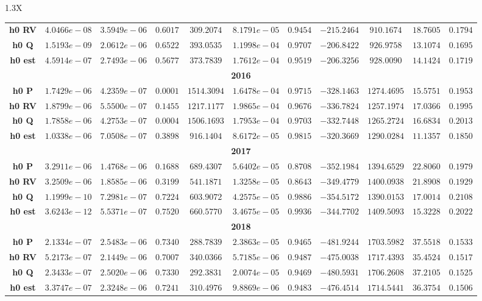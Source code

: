 \documentclass[10pt]{article}
\begin{document}
{\begin{tabularx}{1.3\textwidth}{X}
{\begin{tabular}{ccccccccccc}
 { {\bf h0 RV}}& $4.0466e-08$ & $3.5949e-06$ & $0.6017$ & $309.2074$ & $8.1791e-05$ & $0.9454$ & $-215.2464$& $910.1674$& $18.7605$ &$0.1794$\\
 { {\bf h0 Q}}& $1.5193e-09$ & $2.0612e-06$ & $0.6522$ & $393.0535$ & $1.1998e-04$ & $0.9707$ & $-206.8422$& $926.9758$& $13.1074$ &$0.1695$\\
 { {\bf h0 est}}& $4.5914e-07$ & $2.7493e-06$ & $0.5677$ & $373.7839$ & $1.7612e-04$ & $0.9519$ & $-206.3256$& $928.0090$& $14.1424$ &$0.1719$\\
\bottomrule
\multicolumn{11}{c}{{\bf2016}} \\
\cmidrule(r){1-11} 
 { {\bf h0 P}}& $1.7429e-06$ & $4.2359e-07$ & $0.0001$ & $1514.3094$ & $1.6478e-04$ & $0.9715$ & $-328.1463$& $1274.4695$& $15.5751$ &$0.1953$\\
 { {\bf h0 RV}}& $1.8799e-06$ & $5.5500e-07$ & $0.1455$ & $1217.1177$ & $1.9865e-04$ & $0.9676$ & $-336.7824$& $1257.1974$& $17.0366$ &$0.1995$\\
 { {\bf h0 Q}}& $1.7858e-06$ & $4.2753e-07$ & $0.0004$ & $1506.1693$ & $1.7953e-04$ & $0.9703$ & $-332.7448$& $1265.2724$& $16.6834$ &$0.2013$\\
 { {\bf h0 est}}& $1.0338e-06$ & $7.0508e-07$ & $0.3898$ & $916.1404$ & $8.6172e-05$ & $0.9815$ & $-320.3669$& $1290.0284$& $11.1357$ &$0.1850$\\
\bottomrule
\multicolumn{11}{c}{{\bf2017}} \\
\cmidrule(r){1-11} 
 { {\bf h0 P}}& $3.2911e-06$ & $1.4768e-06$ & $0.1688$ & $689.4307$ & $5.6402e-05$ & $0.8708$ & $-352.1984$& $1394.6529$& $22.8060$ &$0.1979$\\
 { {\bf h0 RV}}& $3.2509e-06$ & $1.8585e-06$ & $0.3199$ & $541.1871$ & $1.3258e-05$ & $0.8643$ & $-349.4779$& $1400.0938$& $21.8908$ &$0.1929$\\
 { {\bf h0 Q}}& $1.1999e-10$ & $7.2981e-07$ & $0.7224$ & $603.9072$ & $4.2575e-05$ & $0.9886$ & $-354.5172$& $1390.0153$& $17.0014$ &$0.2108$\\
 { {\bf h0 est}}& $3.6243e-12$ & $5.5371e-07$ & $0.7520$ & $660.5770$ & $3.4675e-05$ & $0.9936$ & $-344.7702$& $1409.5093$& $15.3228$ &$0.2022$\\
\bottomrule
\multicolumn{11}{c}{{\bf2018}} \\
\cmidrule(r){1-11} 
 { {\bf h0 P}}& $2.1334e-07$ & $2.5483e-06$ & $0.7340$ & $288.7839$ & $2.3863e-05$ & $0.9465$ & $-481.9244$& $1703.5982$& $37.5518$ &$0.1533$\\
 { {\bf h0 RV}}& $5.2173e-07$ & $2.1449e-06$ & $0.7007$ & $340.0366$ & $5.7185e-06$ & $0.9487$ & $-475.0038$& $1717.4393$& $35.4524$ &$0.1517$\\
 { {\bf h0 Q}}& $2.3433e-07$ & $2.5020e-06$ & $0.7330$ & $292.3831$ & $2.0074e-05$ & $0.9469$ & $-480.5931$& $1706.2608$& $37.2105$ &$0.1525$\\
 { {\bf h0 est}}& $3.3747e-07$ & $2.3248e-06$ & $0.7241$ & $310.4976$ & $9.8869e-06$ & $0.9483$ & $-476.4514$& $1714.5441$& $36.3754$ &$0.1506$\\
\bottomrule
\end{tabular}}
\end{tabularx}}

  \vspace{3 cm}

  
\end{document}
